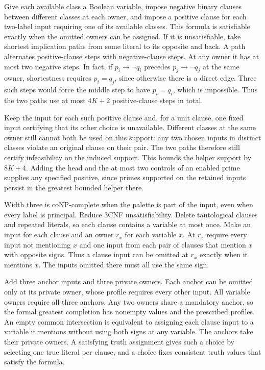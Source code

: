 Give each available class a Boolean variable, impose
negative binary clauses between different classes at
each owner, and impose a positive clause for each
two-label input requiring one of its available classes.
This formula is satisfiable exactly when the omitted
owners can be assigned. If it is unsatisfiable, take
shortest implication paths from some literal to its
opposite and back. A path alternates positive-clause
steps with negative-clause steps. At any owner it has
at most two negative steps. In fact, if
$p_i\to\neg q_i$ precedes $p_j\to\neg q_j$ at the
same owner, shortestness requires $p_i=q_j$, since
otherwise there is a direct edge. Three such steps
would force the middle step to have $p_i=q_i$,
which is impossible. Thus the two paths use at most
$4K+2$ positive-clause steps in total.

Keep the input for each such positive clause and,
for a unit clause, one fixed input certifying that
its other choice is unavailable. Different classes
at the same owner still cannot both be used on this
support: any two chosen inputs in distinct classes
violate an original clause on their pair. The two
paths therefore still certify infeasibility on the
induced support. This bounds the helper support by
$8K+4$. Adding the head and the at most two controls
of an enabled prime supplies any specified positive,
since primes supported on the retained inputs persist
in the greatest bounded helper there.

Width three is coNP-complete when the palette is
part of the input, even when every label is principal.
Reduce 3CNF unsatisfiability. Delete tautological
clauses and repeated literals, so each clause contains
a variable at most once. Make an input for each
clause and an owner $r_x$ for each variable $x$.
At $r_x$ require every input not mentioning $x$ and
one input from each pair of clauses that mention $x$
with opposite signs. Thus a clause input can be
omitted at $r_x$ exactly when it mentions $x$. The
inputs omitted there must all use the same sign.

Add three anchor inputs and three private owners.
Each anchor can be omitted only at its private owner,
whose profile requires every other input. All variable
owners require all three anchors. Any two owners share
a mandatory anchor, so the formal greatest completion
has nonempty values and the prescribed profiles. An
empty common intersection is equivalent to assigning
each clause input to a variable it mentions without
using both signs at any variable. The anchors take
their private owners. A satisfying truth assignment
gives such a choice by selecting one true literal per
clause, and a choice fixes consistent truth values
that satisfy the formula.

